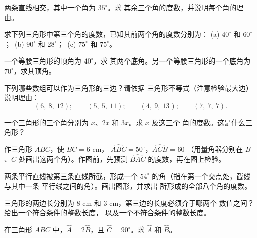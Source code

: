 \begin{exercise}[$\star$]\label{exo:g7:triangles:2}
两条直线相交，其中一个角为 $35^\circ$。求
其余三个角的度数，并说明每个角的理由。
\end{exercise}

\begin{exercise}[$\star$]\label{exo:g7:triangles:3}
求下列三角形中第三个角的度数，已知其前两个角的度数分别为：
(a) $40^\circ$ 和 $60^\circ$；\
(b) $90^\circ$ 和 $28^\circ$；\
(c) $75^\circ$ 和 $75^\circ$。
\end{exercise}

\begin{exercise}[$\star$]\label{exo:g7:triangles:4}
一个等腰三角形的顶角为 $40^\circ$，求
其两个底角。另一个等腰三角形的一个底角为
$70^\circ$，求其顶角。
\end{exercise}

\begin{exercise}[$\star$]\label{exo:g7:triangles:5}
下列哪些数组可以作为三角形的三边？请依据
三角形不等式（注意检验最大边）说明理由：
\[
(6,\ 8,\ 12); \qquad
(5,\ 5,\ 11); \qquad
(4,\ 9,\ 13); \qquad
(7,\ 7,\ 7).
\]
\end{exercise}

\begin{exercise}[$\star$]\label{exo:g7:triangles:6}
一个三角形的三个角分别为 $x$、$2x$ 和 $3x$。求 $x$ 及这三个
角的度数。这是什么三角形？
\end{exercise}

\begin{exercise}[$\star$]\label{exo:g7:triangles:7}
作三角形 $ABC$，使 $BC = 6$ cm，
$\widehat{ABC} = 50^\circ$，$\widehat{ACB} = 60^\circ$（用量角器分别在
$B$、$C$ 处画出这两个角）。作图前，先预测
$\widehat{BAC}$ 的度数，再在图上检验。
\end{exercise}

\begin{exercise}[$\star\star$]\label{exo:g7:triangles:8}
两条平行直线被第三条直线所截，形成一个
$54^\circ$ 的角（指在第一个交点处，截线与其中一条
平行线之间的角）。画出图形，并求出
所形成的全部八个角的度数。
\end{exercise}

\begin{exercise}[$\star\star$]\label{exo:g7:triangles:9}
三角形的两边长分别为 $8$ cm 和 $3$ cm，第三边的长度必须介于哪两个
数值之间？给出一个符合条件的整数长度，
以及一个不符合条件的整数长度。
\end{exercise}

\begin{exercise}[$\star\star$]\label{exo:g7:triangles:10}
在三角形 $ABC$ 中，$\widehat A = 2\widehat B$，且
$\widehat C = 90^\circ$。求 $\widehat A$ 和 $\widehat B$。
\end{exercise}

